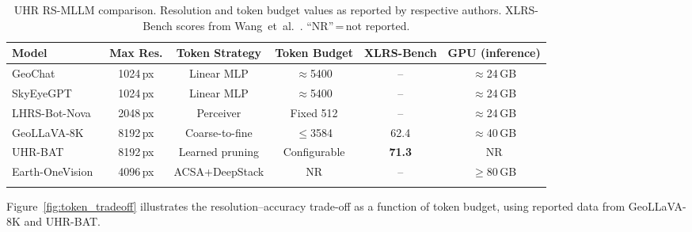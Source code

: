 \begin{table}[h]
\caption{UHR RS-MLLM comparison. Resolution and token
budget values as reported by respective authors. XLRS-Bench scores from
Wang~et~al.~\cite{xlrsbench2025}. ``NR''\,=\,not reported.
}\label{tab:uhr_comparison}
\tiny\setlength\tabcolsep{3pt}
\begin{tabular*}{\textwidth}{@{\extracolsep\fill}lccccc}
\toprule
\textbf{Model} & \textbf{Max Res.} &
\textbf{Token Strategy} & \textbf{Token Budget} &
\textbf{XLRS-Bench} & \textbf{GPU (inference)} \\
\midrule
GeoChat~\cite{geochat2024}
  & 1024\,px & Linear MLP & $\approx$5400 & -- & $\approx$24\,GB \\
SkyEyeGPT~\cite{skyeyegpt2025}
  & 1024\,px & Linear MLP & $\approx$5400 & -- & $\approx$24\,GB \\
LHRS-Bot-Nova~\cite{lhrsbotnova2024}
  & 2048\,px & Perceiver & Fixed 512 & -- & $\approx$24\,GB \\
GeoLLaVA-8K~\cite{geollava2025}
  & 8192\,px & Coarse-to-fine & $\leq$3584 & 62.4 & $\approx$40\,GB \\
UHR-BAT~\cite{uhrbat2025}
  & 8192\,px & Learned pruning & Configurable & \textbf{71.3} & NR \\
Earth-OneVision~\cite{earthonevision2026}
  & 4096\,px & ACSA+DeepStack & NR & -- & $\geq$80\,GB \\
\botrule
\end{tabular*}
\end{table}

Figure~\ref{fig:token_tradeoff} illustrates the resolution--accuracy
trade-off as a function of token budget, using reported data from
GeoLLaVA-8K and UHR-BAT.

